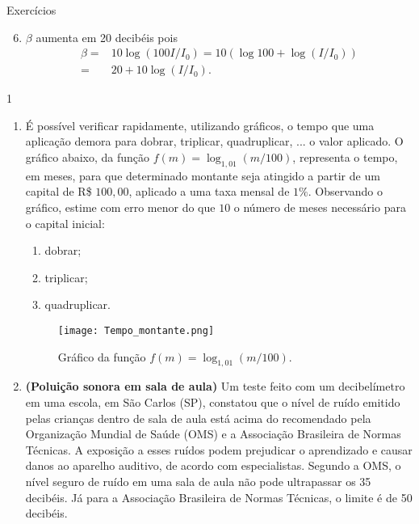 \clearmargin
\begin{answer}{Exercícios}
{
	\exerciselist
	\begin{enumerate}\setcounter{enumi}{5}
	\item $\beta$ aumenta em 20 decibéis pois
	\begin{align*}
	\beta =& 10\log(100 I/I_0) = 10(\log 100 + \log(I/I_0))\\
	=& 20 + 10\log(I/I_0).
	\end{align*}
	\end{enumerate}
}{1}
\end{answer}
\exercise

\begin{enumerate}

\item É possível verificar rapidamente, utilizando gráficos, o tempo que uma aplicação demora para dobrar, triplicar, quadruplicar, ... o valor aplicado. O gráfico abaixo, da função $f(m)=\log_{1{,}01}(m/100)$, representa o tempo, em meses, para que determinado montante seja atingido a partir de um capital de R\$ $100{,}00$, aplicado a uma taxa mensal de $1\%$.  Observando o gráfico, estime com erro menor do que $10$ o número de meses necessário para o capital inicial:
\begin{enumerate}
\item dobrar;
\item triplicar;
\item quadruplicar.
\end{enumerate}

\begin{figure}[H]
\centering

\texttt{[image: Tempo\_montante.png]}
\caption{Gráfico da função $f(m)=\log_{1{,}01} (m/100)$.}
\label{EstimaGraf}
\end{figure}

\item {}\label{poluicaoSonora}

\textbf{(Poluição sonora em sala de aula)} Um teste feito com um decibelímetro em uma escola, em São Carlos (SP), 
constatou que o nível de ruído emitido pelas crianças dentro de sala de aula está acima do recomendado pela Organização 
Mundial de Saúde  (OMS) e a Associação Brasileira de Normas Técnicas. A exposição a esses ruídos podem prejudicar o 
aprendizado e causar danos ao aparelho auditivo, de acordo com especialistas.
Segundo a OMS, o nível seguro de ruído em uma sala de aula não pode ultrapassar os 35 decibéis. Já para a Associação Brasileira de Normas Técnicas, o limite é de 50 decibéis.


\end{enumerate}
